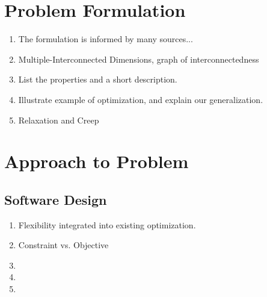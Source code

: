 \documentclass[11pt]{article}
\begin{document}
\section{Problem Formulation}

	\begin{enumerate}
	
		\item The formulation is informed by many sources... 
				
		\item Multiple-Interconnected Dimensions, graph of interconnectedness
	
		\item List the properties and a short description.

		

		\item Illustrate example of optimization, and explain our generalization.
		
		\item Relaxation and Creep
		
	\end{enumerate}
	
	
\section{Approach to Problem}

\subsection{Software Design}
	\begin{enumerate}
	
		
		
		\item Flexibility integrated into existing optimization.
				
		\item Constraint vs. Objective
	
		\item 
		
		\item 
		
		\item 
		
	\end{enumerate}
	
\end{document}
